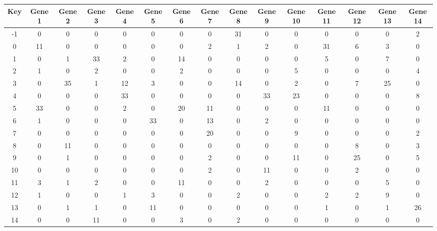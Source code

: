 \begin{tabular}{|c|c|c|c|c|c|c|c|c|c|c|c|c|c|c|}
\hline
Key & Gene 1 & Gene 2 & Gene 3 & Gene 4 & Gene 5 & Gene 6 & Gene 7 & Gene 8 & Gene 9 & Gene 10 & Gene 11 & Gene 12 & Gene 13 & Gene 14 \\
\hline
-1 & 0 & 0 & 0 & 0 & 0 & 0 & 0 & 31 & 0 & 0 & 0 & 0 & 0 & 2 \\
0 & 11 & 0 & 0 & 0 & 0 & 0 & 2 & 1 & 2 & 0 & 31 & 6 & 3 & 0 \\
1 & 0 & 1 & 33 & 2 & 0 & 14 & 0 & 0 & 0 & 0 & 5 & 0 & 7 & 0 \\
2 & 1 & 0 & 2 & 0 & 0 & 2 & 0 & 0 & 0 & 5 & 0 & 0 & 0 & 4 \\
3 & 0 & 35 & 1 & 12 & 3 & 0 & 0 & 14 & 0 & 2 & 0 & 7 & 25 & 0 \\
4 & 0 & 0 & 0 & 33 & 0 & 0 & 0 & 0 & 33 & 23 & 0 & 0 & 0 & 8 \\
5 & 33 & 0 & 0 & 2 & 0 & 20 & 11 & 0 & 0 & 0 & 11 & 0 & 0 & 0 \\
6 & 1 & 0 & 0 & 0 & 33 & 0 & 13 & 0 & 2 & 0 & 0 & 0 & 0 & 0 \\
7 & 0 & 0 & 0 & 0 & 0 & 0 & 20 & 0 & 0 & 9 & 0 & 0 & 0 & 2 \\
8 & 0 & 11 & 0 & 0 & 0 & 0 & 0 & 0 & 0 & 0 & 0 & 8 & 0 & 3 \\
9 & 0 & 1 & 0 & 0 & 0 & 0 & 2 & 0 & 0 & 11 & 0 & 25 & 0 & 5 \\
10 & 0 & 0 & 0 & 0 & 0 & 0 & 2 & 0 & 11 & 0 & 0 & 2 & 0 & 0 \\
11 & 3 & 1 & 2 & 0 & 0 & 11 & 0 & 0 & 2 & 0 & 0 & 0 & 5 & 0 \\
12 & 1 & 0 & 0 & 1 & 3 & 0 & 0 & 2 & 0 & 0 & 2 & 2 & 9 & 0 \\
13 & 0 & 1 & 1 & 0 & 11 & 0 & 0 & 0 & 0 & 0 & 1 & 0 & 1 & 26 \\
14 & 0 & 0 & 11 & 0 & 0 & 3 & 0 & 2 & 0 & 0 & 0 & 0 & 0 & 0 \\
\hline
\end{tabular}
